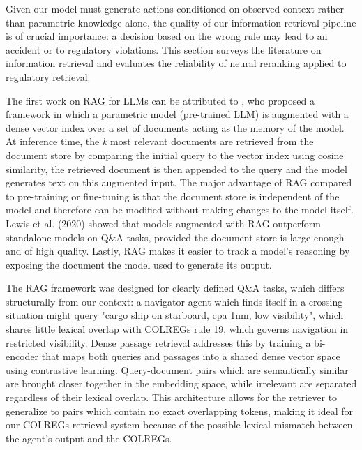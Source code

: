 \documentclass[10pt]{reportMaster}
\begin{document}
Given our model must generate actions conditioned on observed context rather than parametric knowledge alone, the quality of our information retrieval pipeline is of crucial importance: a decision based on the wrong rule may lead to an accident or to regulatory violations. This section surveys the literature on information retrieval and evaluates the reliability of neural reranking applied to regulatory retrieval. 

The first work on RAG for LLMs can be attributed to \cite{lewis2021retrievalaugmentedgenerationknowledgeintensivenlp}, who proposed a framework in which a parametric model (pre-trained LLM) is augmented with a dense vector index over a set of documents acting as the memory of the model. At inference time, the \textit{k} most relevant documents are retrieved from the document store by comparing the initial query to the vector index using cosine similarity, the retrieved document is then appended to the query and the model generates text on this augmented input. The major advantage of RAG compared to pre-training or fine-tuning is that the document store is independent of the model and therefore can be modified without making changes to the model itself. Lewis et al. (2020) showed that models augmented with RAG outperform standalone models on Q\&A tasks, provided the document store is large enough and of high quality. Lastly, RAG makes it easier to track a model's reasoning by exposing the document the model used to generate its output. 

The RAG framework was designed for clearly defined Q\&A tasks, which differs structurally from our context: a navigator agent which finds itself in a crossing situation might query "cargo ship on starboard, cpa 1nm, low visibility", which shares little lexical overlap with COLREGs rule 19, which governs navigation in restricted visibility. Dense passage retrieval addresses this by training a bi-encoder that maps both queries and passages into a shared dense vector space using contrastive learning\cite{karpukhin2020densepassageretrievalopendomain}. Query-document pairs which are semantically similar are brought closer together in the embedding space, while irrelevant are separated regardless of their lexical overlap. This architecture allows for the retriever to generalize to pairs which contain no exact overlapping tokens, making it ideal for our COLREGs retrieval system because of the possible lexical mismatch between the agent's output and the COLREGs. 
\end{document}
